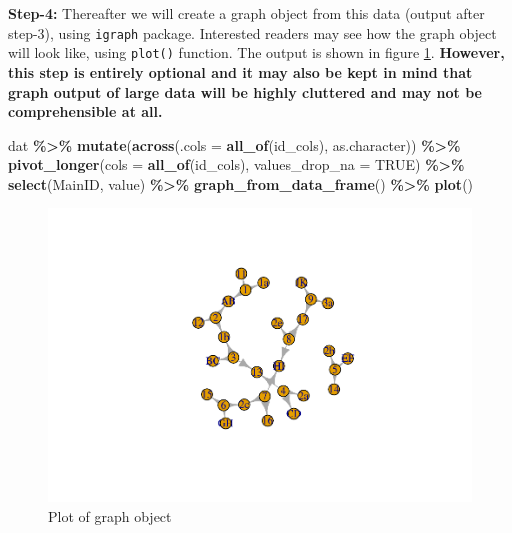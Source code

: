 \documentclass[
]{book}
\newenvironment{Shaded}{\begin{snugshade}}{\end{snugshade}}
\newcommand{\AttributeTok}[1]{\textcolor[rgb]{0.13,0.29,0.53}{#1}}
\newcommand{\ConstantTok}[1]{\textcolor[rgb]{0.56,0.35,0.01}{#1}}
\newcommand{\FunctionTok}[1]{\textcolor[rgb]{0.13,0.29,0.53}{\textbf{#1}}}
\newcommand{\NormalTok}[1]{#1}
\newcommand{\SpecialCharTok}[1]{\textcolor[rgb]{0.81,0.36,0.00}{\textbf{#1}}}
\begin{document}
\textbf{Step-4:} Thereafter we will create a graph object from this data (output after step-3), using \texttt{igraph} package. Interested readers may see how the graph object will look like, using \texttt{plot()} function. The output is shown in figure \ref{fig:igraph2}. \textbf{However, this step is entirely optional and it may also be kept in mind that graph output of large data will be highly cluttered and may not be comprehensible at all.}

\begin{Shaded}
\begin{Highlighting}[]
\NormalTok{dat }\SpecialCharTok{\%\textgreater{}\%} 
  \FunctionTok{mutate}\NormalTok{(}\FunctionTok{across}\NormalTok{(}\AttributeTok{.cols =} \FunctionTok{all\_of}\NormalTok{(id\_cols), as.character)) }\SpecialCharTok{\%\textgreater{}\%} 
  \FunctionTok{pivot\_longer}\NormalTok{(}\AttributeTok{cols =} \FunctionTok{all\_of}\NormalTok{(id\_cols), }
               \AttributeTok{values\_drop\_na =} \ConstantTok{TRUE}\NormalTok{) }\SpecialCharTok{\%\textgreater{}\%} 
  \FunctionTok{select}\NormalTok{(MainID, value) }\SpecialCharTok{\%\textgreater{}\%} 
  \FunctionTok{graph\_from\_data\_frame}\NormalTok{() }\SpecialCharTok{\%\textgreater{}\%}
  \FunctionTok{plot}\NormalTok{()}
\end{Highlighting}
\end{Shaded}

\begin{figure}

{\centering \includegraphics{DauR_files/figure-latex/igraph2-1} 

}

\caption{Plot of graph object}\label{fig:igraph2}
\end{figure}
\end{document}
